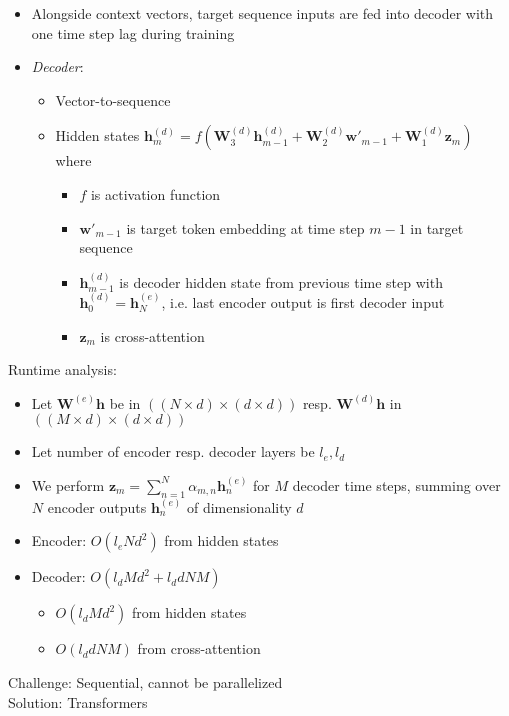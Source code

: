 \begin{itemize}
    \item Alongside context vectors, target sequence inputs are fed into decoder with one time step lag during training
    \item \emph{Decoder}: 
    \begin{itemize}
        \item Vector-to-sequence
        \item Hidden states $\boldsymbol{h}_m^{(d)} = f ( \boldsymbol{W}_3^{(d)} \boldsymbol{h}_{m-1}^{(d)} + \boldsymbol{W}_2^{(d)} \boldsymbol{w'}_{m-1} + \boldsymbol{W}_1^{(d)} \boldsymbol{z}_m )$ where
        \begin{itemize}
            \item $f$ is activation function
            \item $\boldsymbol{w'}_{m-1}$ is target token embedding at time step $m-1$ in target sequence
            \item $\boldsymbol{h}_{m-1}^{(d)}$ is decoder hidden state from previous time step with $\boldsymbol{h}_0^{(d)} = \boldsymbol{h}_N^{(e)}$, i.e. last encoder output is first decoder input
            \item $\boldsymbol{z}_m$ is cross-attention
        \end{itemize} 
    \end{itemize}
\end{itemize}
Runtime analysis:
\begin{itemize}
    \item Let $\boldsymbol{W}^{(e)} \boldsymbol{h}$ be in $((N \times d) \times (d \times d))$ resp. $\boldsymbol{W}^{(d)} \boldsymbol{h}$ in $((M \times d) \times (d \times d))$
    \item Let number of encoder resp. decoder layers be $l_e, l_d$
    \item We perform $\boldsymbol{z}_m = \sum_{n=1}^N \alpha_{m,n} \boldsymbol{h}_n^{(e)}$ for $M$ decoder time steps, summing over $N$ encoder outputs $\boldsymbol{h}_n^{(e)}$ of dimensionality $d$
    \item Encoder: $O(l_e N d^2)$ from hidden states
    \item Decoder: $O(l_d M d^2 + l_d  d N M)$
    \begin{itemize}
        \item $O(l_d M d^2)$ from hidden states
        \item $O(l_d d N M)$ from cross-attention
    \end{itemize}
\end{itemize}
Challenge: Sequential, cannot be parallelized\\
Solution: Transformers

